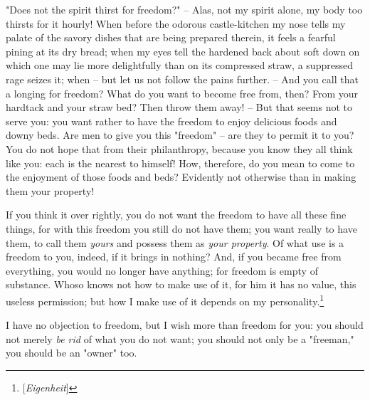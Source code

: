 \documentclass[a4paper]{book}
\begin{document}
"{}Does not the spirit thirst for freedom?"{} -- Alas, not my spirit alone, my 
body too thirsts for it hourly! When before the odorous castle-kitchen my nose 
tells my palate of the savory dishes that are being prepared therein, it feels 
a fearful pining at its dry bread; when my eyes tell the hardened back about 
soft down on which one may lie more delightfully than on its compressed straw, 
a suppressed rage seizes it; when -- but let us not follow the pains further. 
-- And you call that a longing for freedom? What do you want to become free 
from, then? From your hardtack and your straw bed? Then throw them away! -- 
But that seems not to serve you: you want rather to have the freedom to enjoy 
delicious foods and downy beds. Are men to give you this "{}freedom"{} -- are 
they to permit it to you? You do not hope that from their philanthropy, 
because you know they all think like you: each is the nearest to himself! How, 
therefore, do you mean to come to the enjoyment of those foods and beds? 
Evidently not otherwise than in making them your property!

If you think it over rightly, you do not want the freedom to have all these 
fine things, for with this freedom you still do not have them; you want really 
to have them, to call them \textit{yours} and possess them as \textit{your 
property}. Of what use is a freedom to you, indeed, if it brings in nothing? 
And, if you became free from everything, you would no longer have anything; 
for freedom is empty of substance. Whoso knows not how to make use of it, for 
him it has no value, this useless permission; but how I make use of it depends 
on my personality.\footnote{[\textit{Eigenheit}]}

I have no objection to freedom, but I wish more than freedom for you: you 
should not merely \textit{be rid} of what you do not want; you should not only 
be a "{}freeman,"{} you should be an "{}owner"{} too.
\end{document}
